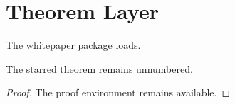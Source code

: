 \documentclass{article}
\begin{document}
\section{Theorem Layer}
\begin{theorem}The whitepaper package loads.\end{theorem}
\begin{theorem*}The starred theorem remains unnumbered.\end{theorem*}
\begin{proof}The proof environment remains available.\end{proof}
\end{document}
